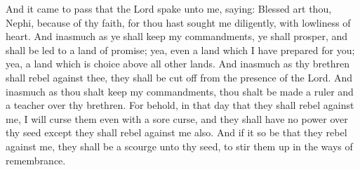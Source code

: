 And it came to pass that the Lord spake unto me, saying: Blessed art thou, Nephi, because of thy faith, for thou hast sought me diligently, with lowliness of heart.
\bverse \iffalse And inasmuch as ye shall keep my commandments, ye shall prosper, and shall be led to a land of promise; yea, even a land which I have prepared for you; yea, a land which is choice above all other lands. \fi
And inasmuch as ye shall keep my commandments, ye shall prosper, and shall be led to a land of promise; yea, even a land which I have prepared for you; yea, a land which is choice above all other lands.
\bverse \iffalse And inasmuch as thy brethren shall rebel against thee, they shall be cut off from the presence of the Lord. \fi
And inasmuch as thy brethren shall rebel against thee, they shall be cut off from the presence of the Lord.
\bverse \iffalse And inasmuch as thou shalt keep my commandments, thou shalt be made a ruler and a teacher over thy brethren. \fi
And inasmuch as thou shalt keep my commandments, thou shalt be made a ruler and a teacher over thy brethren.
\bverse \iffalse For behold, in that day that they shall rebel against me, I will curse them even with a sore curse, and they shall have no power over thy seed except they shall rebel against me also. \fi
For behold, in that day that they shall rebel against me, I will curse them even with a sore curse, and they shall have no power over thy seed except they shall rebel against me also.
\bverse \iffalse And if it so be that they rebel against me, they shall be a scourge unto thy seed, to stir them up in the ways of remembrance. \fi
And if it so be that they rebel against me, they shall be a scourge unto thy seed, to stir them up in the ways of remembrance.

